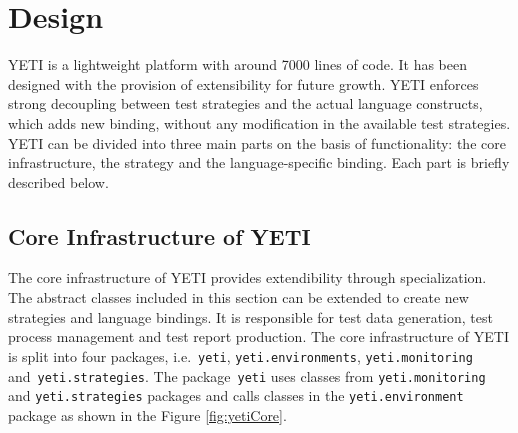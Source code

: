 \section{Design}
YETI is a lightweight platform with around 7000 lines of code. It has been designed with the provision of extensibility for future growth. YETI enforces strong decoupling between test strategies and the actual language constructs, which adds new binding, without any modification in the available test strategies. YETI can be divided into three main parts on the basis of functionality: the core infrastructure, the strategy and the language-specific binding. Each part is briefly described below. 

\subsection{Core Infrastructure of YETI}
The core infrastructure of YETI provides extendibility through specialization. The abstract classes included in this section can be extended to create new strategies and language bindings. It is responsible for test data generation, test process management and test report production. The core infrastructure of YETI is split into four packages, i.e.~\verb+yeti+, \verb+yeti.environments+, \verb+yeti.monitoring+ and~\verb+yeti.strategies+. The package~\verb+yeti+ uses
classes from \verb+yeti.monitoring+ and \verb+yeti.strategies+ packages and calls classes in the \verb+yeti.environment+ package as shown in the Figure \ref{fig:yetiCore}.

